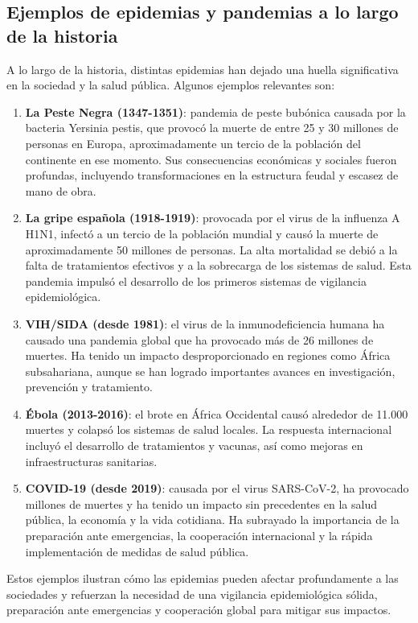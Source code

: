 \subsection{Ejemplos de epidemias y pandemias a lo largo de la historia}
A lo largo de la historia, distintas epidemias han dejado una huella significativa en la sociedad y la salud pública. Algunos ejemplos relevantes son:
\begin{enumerate}
    \item \textbf{La Peste Negra (1347-1351)}: pandemia de peste bubónica causada por la bacteria Yersinia pestis, que provocó la muerte de entre 25 y 30 millones de personas en Europa, aproximadamente un tercio de la población del continente en ese momento. Sus consecuencias económicas y sociales fueron profundas, incluyendo transformaciones en la estructura feudal y escasez de mano de obra.
    \item \textbf{La gripe española (1918-1919)}: provocada por el virus de la influenza A H1N1, infectó a un tercio de la población mundial y causó la muerte de aproximadamente 50 millones de personas. La alta mortalidad se debió a la falta de tratamientos efectivos y a la sobrecarga de los sistemas de salud. Esta pandemia impulsó el desarrollo de los primeros sistemas de vigilancia epidemiológica.
    \item \textbf{VIH/SIDA (desde 1981)}: el virus de la inmunodeficiencia humana ha causado una pandemia global que ha provocado más de 26 millones de muertes. Ha tenido un impacto desproporcionado en regiones como África subsahariana, aunque se han logrado importantes avances en investigación, prevención y tratamiento.
    \item \textbf{Ébola (2013-2016)}: el brote en África Occidental causó alrededor de 11.000 muertes y colapsó los sistemas de salud locales. La respuesta internacional incluyó el desarrollo de tratamientos y vacunas, así como mejoras en infraestructuras sanitarias.
    \item \textbf{COVID-19 (desde 2019)}: causada por el virus SARS-CoV-2, ha provocado millones de muertes y ha tenido un impacto sin precedentes en la salud pública, la economía y la vida cotidiana. Ha subrayado la importancia de la preparación ante emergencias, la cooperación internacional y la rápida implementación de medidas de salud pública.
\end{enumerate}
Estos ejemplos ilustran cómo las epidemias pueden afectar profundamente a las sociedades y refuerzan la necesidad de una vigilancia epidemiológica sólida, preparación ante emergencias y cooperación global para mitigar sus impactos.

